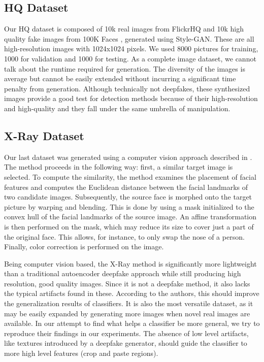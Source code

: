\documentclass[11pt]{article}
\begin{document}
\subsection{HQ Dataset}
Our HQ dataset is composed of 10k real images from FlickrHQ and 10k high quality fake images from 100K Faces \cite{karras2019style}, generated using Style-GAN. These are all high-resolution images with 1024x1024 pixels. We used 8000 pictures for training, 1000 for validation and 1000 for testing. As a complete image dataset, we cannot talk about the runtime required for generation. The diversity of the images is average but cannot be easily extended without incurring a significant time penalty from generation. Although technically not deepfakes, these synthesized images provide a good test for detection methods because of their high-resolution and high-quality and they fall under the same umbrella of manipulation.

\subsection{X-Ray Dataset}
Our last dataset was generated using a computer vision approach described in \cite{li2020face}. The method proceeds in the following way: first, a similar target image is selected. To compute the similarity, the method examines the placement of facial features and computes the Euclidean distance between the facial landmarks of two candidate images. Subsequently, the source face is morphed onto the target picture by warping and blending. This is done by using a mask initialized to the convex hull of the facial landmarks of the source image. An affine transformation is then performed on the mask, which may reduce its size to cover just a part of the original face. This allows, for instance, to only swap the nose of a person. Finally, color correction is performed on the image.

Being computer vision based, the X-Ray method is significantly more lightweight than a traditional autoencoder deepfake approach while still producing high resolution, good quality images. Since it is not a deepfake method, it also lacks the typical artifacts found in these. According to the authors, this should improve the generalization results of classifiers. It is also the most versatile dataset, as it may be easily expanded by generating more images when novel real images are available.
In our attempt to find what helps a classifier be more general, we try to reproduce their findings in our experiments. The absence of low level artifacts, like textures introduced by a deepfake generator, should guide the classifier to more high level features (crop and paste regions).
\end{document}
